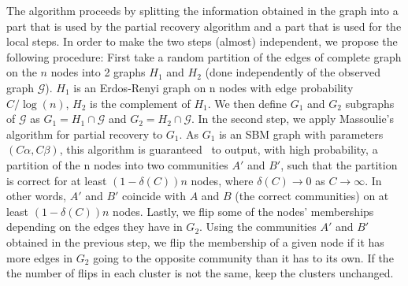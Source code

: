 \documentclass[english]{article}
\newcommand{\1}{\textbf{1}}
\newcommand{\G}{\mathcal{G}}
\begin{document}
The algorithm proceeds by splitting the information obtained in the graph into a part that is used by the partial recovery algorithm and a part that is used for the local steps. In order to make the two steps (almost) independent, we propose the following procedure: First take a random partition of the edges of complete graph on the $n$ nodes into 2 graphs $H_1$ and $H_2$ (done independently of the observed graph $\G$). $H_1$ is an Erdos-Renyi graph on n nodes with edge probability $C/\log(n)$, $H_2$ is the complement of $H_1$. We then define $G_1$ and $G_2$ subgraphs of $\G$ as $G_1=H_1 \cap \G$ and $G_2=H_2 \cap \G$. In the second step, we apply Massoulie's~\cite{Massoulie_SBM} algorithm for partial recovery to $G_1$. As $G_1$ is an SBM graph with parameters $(C\alpha,C\beta)$, this algorithm is guaranteed~\cite{Massoulie_SBM} to output, with high probability, a partition of the n nodes into two communities $A'$ and $B'$, such that the partition is correct for at least $(1-\delta(C))n$ nodes, where $\delta(C)\to 0$ as $C\to\infty$. In other words, $A'$ and $B'$ coincide with $A$ and $B$ (the correct communities) on at least $(1-\delta(C))n$ nodes. %
Lastly, we flip some of the nodes' memberships depending on the edges they have in $G_2$. Using the communities $A'$ and $B'$ obtained in the previous step, we flip the membership of a given node if it has more edges in $G_2$  going to the opposite community than it has to its own. If the the number of flips in each cluster is not the same, keep the clusters unchanged. %
\end{document}
